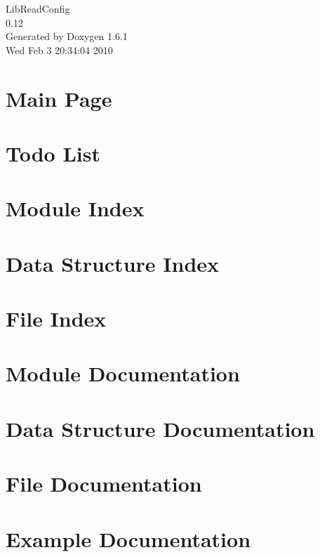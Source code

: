 \documentclass[a4paper]{article}
\begin{document}
\hypersetup{pageanchor=false}
\begin{titlepage}
\vspace*{7cm}
\begin{center}
{\Large LibReadConfig \\[1ex]\large 0.12 }\\
\vspace*{1cm}
{\large Generated by Doxygen 1.6.1}\\
\vspace*{0.5cm}
{\small Wed Feb 3 20:34:04 2010}\\
\end{center}
\end{titlepage}
\tableofcontents
{}
\hypersetup{pageanchor=true}
\section{Main Page}
\label{index}\hypertarget{index}{}
\section{Todo List}
\label{todo}
\hypertarget{todo}{}

\section{Module Index}

\section{Data Structure Index}

\section{File Index}

\section{Module Documentation}




\section{Data Structure Documentation}



\section{File Documentation}



\section{Example Documentation}



\printindex
\end{document}
